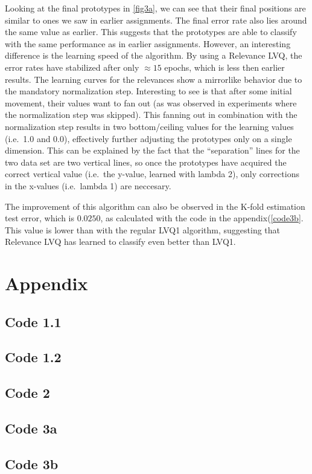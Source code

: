 \documentclass[10pt]{article}
\begin{document}
Looking at the final prototypes in \autoref{fig3a}, we can see that their final positions are similar to ones we saw in earlier assignments.
The final error rate also lies around the same value as earlier.
This suggests that the prototypes are able to classify with the same performance as in earlier assignments.
However, an interesting difference is the learning speed of the algorithm. 
By using a Relevance LVQ, the error rates have stabilized after only $\approx15$ epochs, which is less then earlier results.
The learning curves for the relevances show a mirrorlike behavior due to the mandatory normalization step.
Interesting to see is that after some initial movement, their values want to fan out (as was observed in experiments where the normalization step was skipped).
This fanning out in combination with the normalization step results in two bottom/ceiling values for the learning values (i.e.\ 1.0 and 0.0),
effectively further adjusting the prototypes only on a single dimension.
This can be explained by the fact that the ``separation'' lines for the two data set are two vertical lines, 
so once the prototypes have acquired the correct vertical value (i.e.\ the y-value, learned with lambda 2),
only corrections in the x-values (i.e.\ lambda 1) are neccesary.

The improvement of this algorithm can also be observed in the K-fold estimation test error, 
which is $0.0250$, as calculated with the code in the appendix(\autoref{code3b}.
This value is lower than with the regular LVQ1 algorithm, suggesting that Relevance LVQ has learned to classify even better than LVQ1.
\newpage
\section*{Appendix}
\subsection{Code 1.1}
{\label{code1_1}}
\subsection{Code 1.2}
{\label{code1_2}}
\subsection{Code 2}
{\label{code2}}
\subsection{Code 3a}
{\label{code3a}}
\subsection{Code 3b}
{\label{code3b}}



\maketitle
\end{document}
